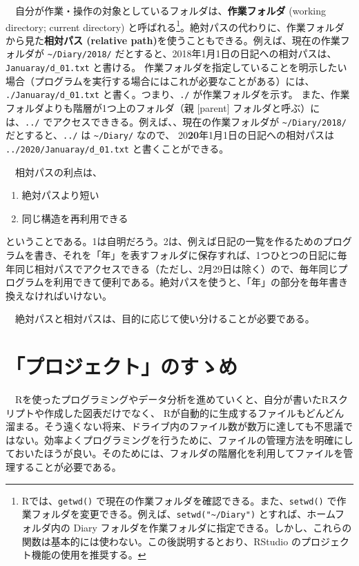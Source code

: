\documentclass[
  a4paper,
  pandoc,
  ja=standard,
  jafont=haranoaji]{bxjsbook}
\providecommand{\tightlist}{%
  \setlength{\itemsep}{0pt}\setlength{\parskip}{0pt}}
\begin{document}
　自分が作業・操作の対象としているフォルダは、\textbf{作業フォルダ}
(working directory; current directory)
と呼ばれる\footnote{Rでは、\texttt{getwd()}
  で現在の作業フォルダを確認できる。また、\texttt{setwd()}
  で作業フォルダを変更できる。例えば、\texttt{setwd("\textasciitilde{}/Diary")}
  とすれば、ホームフォルダ内の Diary
  フォルダを作業フォルダに指定できる。しかし、これらの関数は基本的には使わない。この後説明するとおり、RStudio
  のプロジェクト機能の使用を推奨する。}。絶対パスの代わりに、作業フォルダから見た\textbf{相対パス
(relative path)}を使うこともできる。例えば、現在の作業フォルダが
\texttt{\textasciitilde{}/Diary/2018/}
だとすると、2018年1月1日の日記への相対パスは、\texttt{Januaray/d\_01.txt}
と書ける。
作業フォルダを指定していることを明示したい場合（プログラムを実行する場合にはこれが必要なことがある）には、
\texttt{./Januaray/d\_01.txt} と書く。つまり、\texttt{./}
が作業フォルダを示す。 また、作業フォルダよりも階層が1つ上のフォルダ（親
{[}parent{]} フォルダと呼ぶ）には、\texttt{../}
でアクセスでききる。例えば、、現在の作業フォルダが
\texttt{\textasciitilde{}/Diary/2018/} だとすると、\texttt{../} は
\texttt{\textasciitilde{}/Diary/} なので、
20\textbf{20}年1月1日の日記への相対パスは　\texttt{../2020/Januaray/d\_01.txt}
と書くことができる。

　相対パスの利点は、

\begin{enumerate}
\def\labelenumi{\arabic{enumi}.}
\tightlist
\item
  絶対パスより短い
\item
  同じ構造を再利用できる
\end{enumerate}

ということである。1は自明だろう。2は、例えば日記の一覧を作るためのプログラムを書き、それを「年」を表すフォルダに保存すれば、1つひとつの日記に毎年同じ相対パスでアクセスできる（ただし、2月29日は除く）ので、毎年同じプログラムを利用できて便利である。絶対パスを使うと、「年」の部分を毎年書き換えなければいけない。

　絶対パスと相対パスは、目的に応じて使い分けることが必要である。

\hypertarget{sec-rbasic_project}{%
\section{「プロジェクト」のすゝめ}\label{sec-rbasic_project}}

　Rを使ったプログラミングやデータ分析を進めていくと、自分が書いたRスクリプトや作成した図表だけでなく、
Rが自動的に生成するファイルもどんどん溜まる。そう遠くない将来、ドライブ内のファイル数が数万に達しても不思議ではない。効率よくプログラミングを行うために、ファイルの管理方法を明確にしておいたほうが良い。そのためには、フォルダの階層化を利用してファイルを管理することが必要である。
\end{document}
